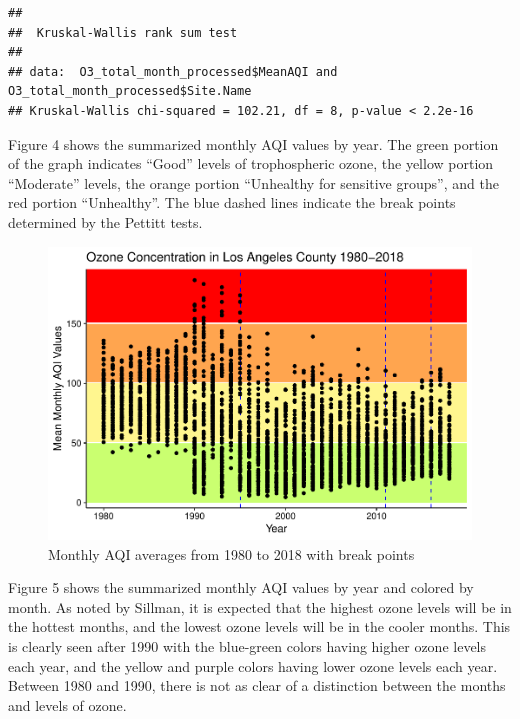 \documentclass[12pt,]{article}
\begin{document}
\begin{verbatim}
## 
##  Kruskal-Wallis rank sum test
## 
## data:  O3_total_month_processed$MeanAQI and O3_total_month_processed$Site.Name
## Kruskal-Wallis chi-squared = 102.21, df = 8, p-value < 2.2e-16
\end{verbatim}

Figure 4 shows the summarized monthly AQI values by year. The green
portion of the graph indicates ``Good'' levels of trophospheric ozone,
the yellow portion ``Moderate'' levels, the orange portion ``Unhealthy
for sensitive groups'', and the red portion ``Unhealthy''. The blue
dashed lines indicate the break points determined by the Pettitt tests.

\begin{figure}
\centering
\includegraphics{Roth_ENV872_Project_files/figure-latex/plot data with break points-1.pdf}
\caption{Monthly AQI averages from 1980 to 2018 with break points}
\end{figure}

Figure 5 shows the summarized monthly AQI values by year and colored by
month. As noted by Sillman, it is expected that the highest ozone levels
will be in the hottest months, and the lowest ozone levels will be in
the cooler months. This is clearly seen after 1990 with the blue-green
colors having higher ozone levels each year, and the yellow and purple
colors having lower ozone levels each year. Between 1980 and 1990, there
is not as clear of a distinction between the months and levels of ozone.
\end{document}
